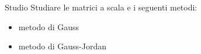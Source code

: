 \documentclass{beamer}
\begin{document}
\generatitolo

\begin{frame}{Studio}
Studiare le \alert{matrici a scala} e i seguenti metodi:

\begin{itemize}
\item metodo di Gauss
\item metodo di Gauss-Jordan
\end{itemize}
\end{frame}
\end{document}
